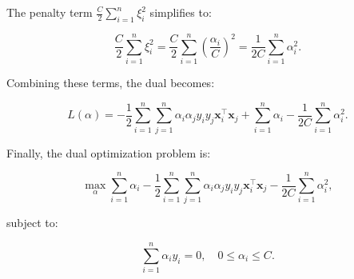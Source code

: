 \documentclass[11pt]{article}
\begin{document}
The penalty term \( \frac{C}{2} \sum_{i=1}^n \xi_i^2 \) simplifies to:

\[
\frac{C}{2} \sum_{i=1}^n \xi_i^2 = \frac{C}{2} \sum_{i=1}^n \left(\frac{\alpha_i}{C}\right)^2 = \frac{1}{2C} \sum_{i=1}^n \alpha_i^2.
\]

Combining these terms, the dual becomes:

\[
L(\alpha) = -\frac{1}{2} \sum_{i=1}^n \sum_{j=1}^n \alpha_i \alpha_j y_i y_j \mathbf{x}_i^\top \mathbf{x}_j + \sum_{i=1}^n \alpha_i - \frac{1}{2C} \sum_{i=1}^n \alpha_i^2.
\]

Finally, the dual optimization problem is:

\[
\max_{\alpha} \sum_{i=1}^n \alpha_i - \frac{1}{2} \sum_{i=1}^n \sum_{j=1}^n \alpha_i \alpha_j y_i y_j \mathbf{x}_i^\top \mathbf{x}_j - \frac{1}{2C} \sum_{i=1}^n \alpha_i^2,
\]

subject to:

\[
\sum_{i=1}^n \alpha_i y_i = 0, \quad 0 \leq \alpha_i \leq C.
\]
\end{document}
